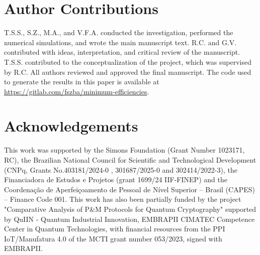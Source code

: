 \documentclass[aps,pra,reprint, superscriptaddress,showkeys]{revtex4-2}
\theoremstyle{plain}
\begin{document}
\section*{Author Contributions}

T.S.S., S.Z., M.A., and V.F.A. conducted the investigation, performed the numerical simulations, and wrote the main manuscript text. R.C. and G.V. contributed with ideas, interpretation, and critical review of the manuscript. T.S.S. contributed to the conceptualization of the project, which was supervised by R.C. All authors reviewed and approved the final manuscript. The code used to generate the results in this paper is available at
\url{https://gitlab.com/fszba/minimum-efficiencies}.

\section*{Acknowledgements}
This work was supported by the Simons Foundation (Grant Number 1023171, RC), the Brazilian National Council for Scientific and Technological Development (CNPq, Grants No.403181/2024-0 , 301687/2025-0 and 302414/2022-3), the Financiadora de Estudos e Projetos (grant 1699/24 IIF-FINEP) and the Coordenação de Aperfeiçoamento de Pessoal de Nível Superior – Brasil (CAPES) – Finance Code 001. This work has also been partially funded by the project "Comparative Analysis of P\&M Protocols for Quantum Cryptography" supported by QuIIN - Quantum Industrial Innovation, EMBRAPII CIMATEC Competence Center in Quantum Technologies, with financial resources from the PPI IoT/Manufatura 4.0 of the MCTI grant number 053/2023, signed with EMBRAPII.





\end{document}
